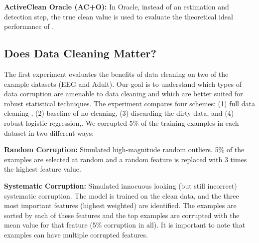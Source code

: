\vspace{0.25em}

\noindent\textbf{ActiveClean Oracle (AC+O): } In \sys Oracle, instead of an estimation and detection step, the true clean value is used to evaluate the theoretical ideal performance of \sys.

\subsection{Does Data Cleaning Matter?}
The first experiment evaluates the benefits of data cleaning on two of the example datasets (EEG and Adult).
Our goal is to understand which types of data corruption are amenable to data cleaning and which are better suited for robust statistical techniques.
The experiment compares four schemes: (1) full data cleaning  , (2) baseline of no cleaning, (3) discarding the dirty data, and (4) robust logistic regression,. We corrupted 5\% of the training examples in each dataset in two different ways:

\vspace{0.5em}

\noindent\textbf{Random Corruption: } Simulated high-magnitude random outliers. 5\% of the examples are selected at random and a random feature is replaced with 3 times the highest feature value.

\vspace{0.5em}

\noindent\textbf{Systematic Corruption: } Simulated innocuous looking (but still incorrect) systematic corruption. The model is trained on the clean data, and the three most important features (highest weighted) are identified. The examples are sorted by each of these features and the top examples are corrupted with the mean value for that feature (5\% corruption in all). 
It is important to note that examples can have multiple corrupted features.

